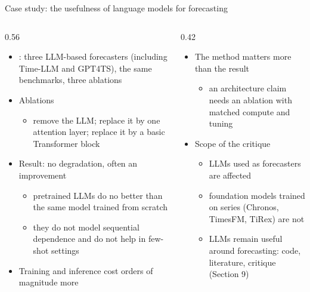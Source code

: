 \begin{frame}{Case study: the usefulness of language models for forecasting}
\itemsize{\small}
\begin{columns}[T]
\begin{column}{0.56\textwidth}
\begin{itemize}
    \item {}: three LLM-based forecasters (including Time-LLM and GPT4TS), the same benchmarks, three ablations
    \item Ablations
    \begin{itemize}
        \item remove the LLM; replace it by one attention layer; replace it by a basic Transformer block
    \end{itemize}
    \item Result: no degradation, often an improvement
    \begin{itemize}
        \item pretrained LLMs do no better than the same model trained from scratch
        \item they do not model sequential dependence and do not help in few-shot settings
    \end{itemize}
    \item Training and inference cost orders of magnitude more
\end{itemize}
\end{column}
\begin{column}{0.42\textwidth}
\begin{itemize}
    \item The method matters more than the result
    \begin{itemize}
        \item an architecture claim needs an ablation with matched compute and tuning
    \end{itemize}
    \item Scope of the critique
    \begin{itemize}
        \item LLMs used as forecasters are affected
        \item foundation models trained on series (Chronos, TimesFM, TiRex) are not
        \item LLMs remain useful around forecasting: code, literature, critique (Section 9)
    \end{itemize}
\end{itemize}
\end{column}
\end{columns}
\end{frame}

